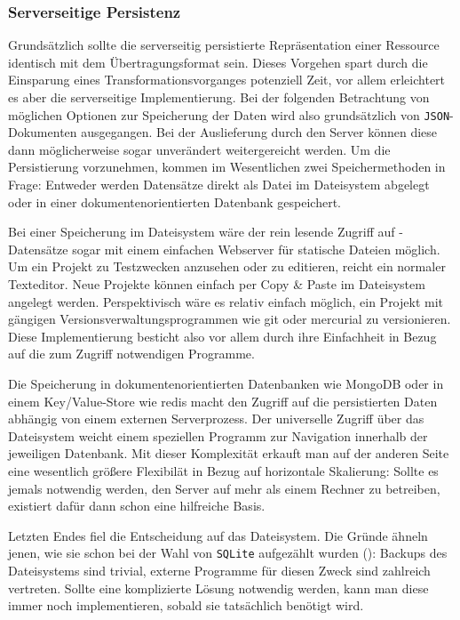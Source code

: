 \subsubsection{Serverseitige Persistenz}
\label{sec:implementation-persistence}

Grundsätzlich sollte die serverseitig persistierte Repräsentation einer Ressource identisch mit dem Übertragungsformat sein. Dieses Vorgehen spart durch die Einsparung eines Transformationsvorganges potenziell Zeit, vor allem erleichtert es aber die serverseitige Implementierung. Bei der folgenden Betrachtung von möglichen Optionen zur Speicherung der Daten wird also grundsätzlich von \texttt{JSON}-Dokumenten ausgegangen. Bei der Auslieferung durch den Server können diese dann möglicherweise sogar unverändert weitergereicht werden. Um die Persistierung vorzunehmen, kommen im Wesentlichen zwei Speichermethoden in Frage: Entweder werden Datensätze direkt als Datei im Dateisystem abgelegt oder in einer dokumentenorientierten Datenbank gespeichert.

Bei einer Speicherung im Dateisystem wäre der rein lesende Zugriff auf \idename-Datensätze sogar mit einem einfachen Webserver für statische Dateien möglich. Um ein Projekt zu Testzwecken anzusehen oder zu editieren, reicht ein normaler Texteditor. Neue Projekte können einfach per Copy \& Paste im Dateisystem angelegt werden. Perspektivisch wäre es relativ einfach möglich, ein Projekt mit gängigen Versionsverwaltungsprogrammen wie git oder mercurial zu versionieren. Diese Implementierung besticht also vor allem durch ihre Einfachheit in Bezug auf die zum Zugriff notwendigen Programme.

Die Speicherung in dokumentenorientierten Datenbanken wie MongoDB oder in einem Key/Value-Store wie redis macht den Zugriff auf die persistierten Daten abhängig von einem externen Serverprozess. Der universelle Zugriff über das Dateisystem weicht einem speziellen Programm zur Navigation innerhalb der jeweiligen Datenbank. Mit dieser Komplexität erkauft man auf der anderen Seite eine wesentlich größere Flexibilät in Bezug auf horizontale Skalierung: Sollte es jemals notwendig werden, den Server auf mehr als einem Rechner zu betreiben, existiert dafür dann schon eine hilfreiche Basis.

Letzten Endes fiel die Entscheidung auf das Dateisystem. Die Gründe ähneln jenen, wie sie schon bei der Wahl von \texttt{SQLite} aufgezählt wurden (): Backups des Dateisystems sind trivial, externe Programme für diesen Zweck sind zahlreich vertreten. Sollte eine komplizierte Lösung notwendig werden, kann man diese immer noch implementieren, sobald sie tatsächlich benötigt wird.


